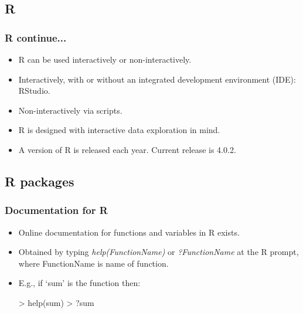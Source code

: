 \documentclass[11pt]{beamer}
\begin{document}
\subsection{R}
\begin{frame}
\frametitle{{\sf R} continue...}
\begin{itemize}
\item {\sf R} can be used interactively or non-interactively.
\vspace{0.2in}
\item Interactively, with or without an integrated development environment (IDE): RStudio.
\vspace{0.2in}
\item Non-interactively via scripts.
\vspace{0.2in}
\item {\sf R} is designed with interactive data exploration in mind.
\vspace{0.2in}
\item A version of {\sf R} is released each year. Current release is 4.0.2.
\end{itemize}
\end{frame}



\subsection{R packages}
\begin{frame}[fragile]
\frametitle{Documentation for {\sf R}}
\begin{itemize}
\item Online documentation for functions and variables in {\sf R} exists.
\vspace{0.2in}
\item Obtained by typing \textit{help(FunctionName)} or  \textit{?FunctionName} at the {\sf R} prompt, where FunctionName is name of function.
\vspace{0.2in}
\item E.g., if `sum' is the function then: 
\vspace{0.1in}
\begin{semiverbatim}
> help(sum)
> ?sum
\end{semiverbatim}
\end{itemize}
\end{frame}
\end{document}
